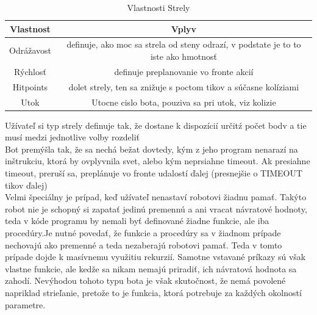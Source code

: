 \begin{table}[h]
\caption{Vlastnosti Strely}   %
\centering                          %
\begin{tabular}{cc}            %
\hline\hline                        %
Vlastnost & Vplyv \\   %
\hline                              %
Odrážavost & definuje, ako moc sa strela od steny odrazí, v podstate je to to iste ako hmotnosť\\ \hline
Rýchlosť & definuje preplanovanie vo fronte akcií\\ \hline
Hitpoints  & dolet strely, ten sa znižuje s poctom tikov a súčasne kolíziami\\ \hline
Utok & Utocne cislo bota, pouziva sa pri utok, viz kolizie \\ \hline
\hline                              %
\end{tabular}
\end{table}

Užívateľ si typ strely definuje tak, že dostane k dispozícií určitź počet bodv a tie musí medzi jednotlive volby rozdeliť\\
Bot premýšla tak, že sa nechá bežat dovtedy, kým z jeho program nenarazí na inštrukciu, ktorá by ovplyvnila svet, alebo kým neprsiahne timeout. Ak presiahne timeout, preruší sa, preplánuje vo fronte udalostí ďalej (presnejšie o TIMEOUT tikov ďalej)\\
Velmi špeciálny je prípad, keď užívateľ nenastaví robotovi žiadnu pamať. Takýto robot nie je schopný si zapatať jedinú premennú a ani vracat návratové hodnoty, teda v kóde programu by nemali byť definované žiadne funkcie, ale iba procedúry.Je nutné povedať, že funkcie a procedúry sa v žiadnom prípade nechovajú ako premenné a teda nezaberajú robotovi pamať. Teda v tomto prípade dojde k masívnemu využitiu rekurzií. Samotne vstavané príkazy sú však vlastne funkcie, ale kedže sa nikam nemajú priradiť, ich návratová hodnota sa zahodí. Nevýhodou tohoto typu bota je však skutočnost, že nemá povolené napriklad strieľanie, pretože to je funkcia, ktorá potrebuje za každých okolností parametre.
